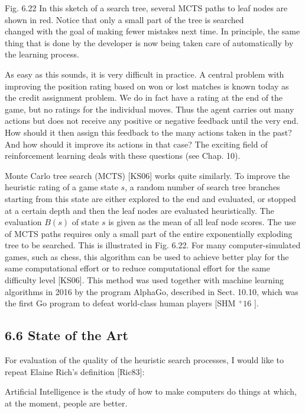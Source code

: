 \documentclass[10pt]{article}
\begin{document}
Fig. 6.22 In this sketch of a search tree, several MCTS paths to leaf nodes are shown in red. Notice that only a small part of the tree is searched\\

changed with the goal of making fewer mistakes next time. In principle, the same thing that is done by the developer is now being taken care of automatically by the learning process.

As easy as this sounds, it is very difficult in practice. A central problem with improving the position rating based on won or lost matches is known today as the credit assignment problem. We do in fact have a rating at the end of the game, but no ratings for the individual moves. Thus the agent carries out many actions but does not receive any positive or negative feedback until the very end. How should it then assign this feedback to the many actions taken in the past? And how should it improve its actions in that case? The exciting field of reinforcement learning deals with these questions (see Chap. 10).

Monte Carlo tree search (MCTS) [KS06] works quite similarly. To improve the heuristic rating of a game state $s$, a random number of search tree branches starting from this state are either explored to the end and evaluated, or stopped at a certain depth and then the leaf nodes are evaluated heuristically. The evaluation $B(s)$ of state $s$ is given as the mean of all leaf node scores. The use of MCTS paths requires only a small part of the entire exponentially exploding tree to be searched. This is illustrated in Fig. 6.22. For many computer-simulated games, such as chess, this algorithm can be used to achieve better play for the same computational effort or to reduce computational effort for the same difficulty level [KS06]. This method was used together with machine learning algorithms in 2016 by the program AlphaGo, described in Sect. 10.10, which was the first Go program to defeat world-class human players [SHM ${ }^{+} 16$ ].

\subsection*{6.6 State of the Art}
For evaluation of the quality of the heuristic search processes, I would like to repeat Elaine Rich's definition [Ric83]:

Artificial Intelligence is the study of how to make computers do things at which, at the moment, people are better.
\end{document}
